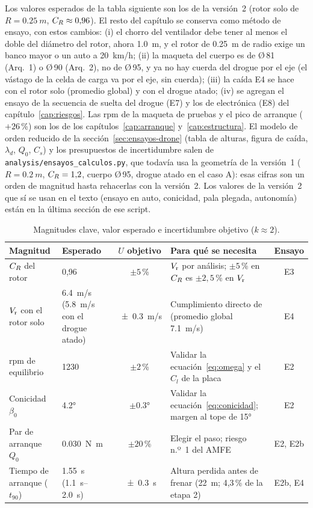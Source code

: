 \begin{nota}
Los valores esperados de la tabla siguiente son los de la versión~2 (rotor solo de $R=\SI{0.25}{m}$, $C_{R}\approx0{,}96$). El resto del
capítulo se conserva como método de ensayo, con estos cambios: (i) el chorro del ventilador debe tener al menos el doble del diámetro del rotor, ahora
\SI{1.0}{m}, y el rotor de \SI{0.25}{m} de radio exige un banco mayor o un auto a \SI{20}{km/h}; (ii) la maqueta del cuerpo es de Ø\,81 (Arq.~1) o
Ø\,90 (Arq.~2), no de Ø\,95, y ya no hay cuerda del drogue por el eje (el vástago de la celda de carga va por el eje, sin cuerda); (iii) la caída E4
se hace con el rotor solo (promedio global) y con el drogue atado; (iv) se agregan el ensayo de la secuencia de suelta del drogue (E7) y los de electrónica (E8) del
capítulo~\ref{cap:riesgos}. Las rpm de la maqueta de pruebas y el pico de arranque ($+26$\,\%) son los de los capítulos~\ref{cap:arranque} y~\ref{cap:estructura}.
El modelo de orden reducido de la sección~\ref{sec:ensayos-drone} (tabla de alturas, figura de caída, $\lambda_d$, $Q_0$, $C_s$) y los presupuestos de incertidumbre salen de
\texttt{analysis/ensayos\_calculos.py}, que todavía usa la geometría de la versión~1 ($R=\SI{0.2}{m}$, $C_{R}=1{,}2$, cuerpo Ø\,95, drogue atado en el caso A):
esas cifras son un orden de magnitud hasta rehacerlas con la versión~2. Los valores de la versión~2 que sí se usan en el texto (ensayo en auto, conicidad,
pala plegada, autonomía) están en la última sección de ese script.
\end{nota}

\begin{table}[H]
\centering\small
\caption{Magnitudes clave, valor esperado e incertidumbre objetivo ($k\approx2$).}
\label{tab:ensayos-magnitudes}
\begin{tabularx}{\textwidth}{@{}llcYc@{}}
\toprule
\textbf{Magnitud} & \textbf{Esperado} & \textbf{$U$ objetivo} & \textbf{Para qué se necesita} & \textbf{Ensayo}\\\midrule
$C_{R}$ del rotor & 0,96 & $\pm5$\,\% & $V_{\mathrm{r}}$ por análisis; $\pm5$\,\% en $C_{R}$ es $\pm2{,}5$\,\% en $V_{\mathrm{r}}$ & E3\\
$V_{\mathrm{r}}$ con el rotor solo & \SI{6.4}{m/s} (\SI{5.8}{m/s} con el drogue atado) & \SI{\pm0.3}{m/s} & Cumplimiento directo de  (promedio global \SI{7.1}{m/s}) & E4\\
rpm de equilibrio & \num{1230} & $\pm2$\,\% & Validar la ecuación~\eqref{eq:omega} y el $C_l$ de la placa & E2\\
Conicidad $\beta_0$ & \ang{4.2} & $\pm\ang{0.3}$ & Validar la ecuación~\eqref{eq:conicidad}; margen al tope de \ang{15} & E2\\
Par de arranque $Q_0$ & \SI{0.030}{N.m} & $\pm20$\,\% & Elegir el paso; riesgo n.º~1 del AMFE & E2, E2b\\
Tiempo de arranque ($t_{90}$) & \SI{1.55}{s} (\SIrange{1.1}{2.0}{s}) & \SI{\pm0.3}{s} & Altura perdida antes de frenar (\SI{22}{m}; 4,3\,\% de la etapa 2) & E2b, E4\\
\bottomrule
\end{tabularx}
\end{table}

